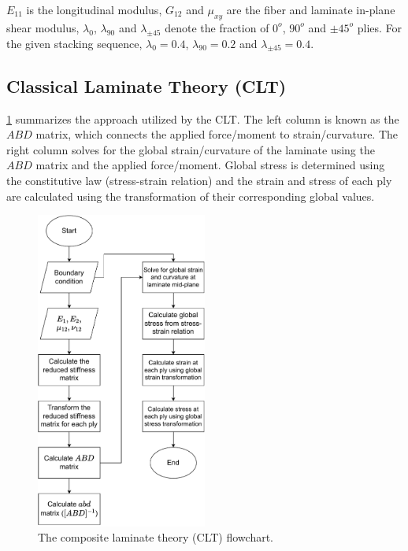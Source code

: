 \documentclass{article}
\begin{document}
$E_{11}$ is the longitudinal modulus, $G_{12}$ and $\mu_{xy}$ are the fiber and laminate in-plane shear modulus, $\lambda_0$, $\lambda_{90}$ and $\lambda_{\pm45}$ denote the fraction of $0^o$, $90^o$ and $\pm45^o$ plies. For the given stacking sequence, $\lambda_0 = 0.4$, $\lambda_{90} = 0.2$ and $\lambda_{\pm45} = 0.4$.

\subsection{Classical Laminate Theory (CLT)}
\cref{fig:clt_algorithm} summarizes the approach utilized by the CLT. The left column is known as the $ABD$ matrix, which connects the applied force/moment to strain/curvature. The right column solves for the global strain/curvature of the laminate using the $ABD$ matrix and the applied force/moment. Global stress is determined using the constitutive law (stress-strain relation) and the strain and stress of each ply are calculated using the transformation of their corresponding global values.

\begin{figure}[h]
    \centering
    \includegraphics[width=0.5\textwidth]{figures/clt_algorithm.pdf}
    \caption{The composite laminate theory (CLT) flowchart.}
    \label{fig:clt_algorithm}
\end{figure}
\end{document}
